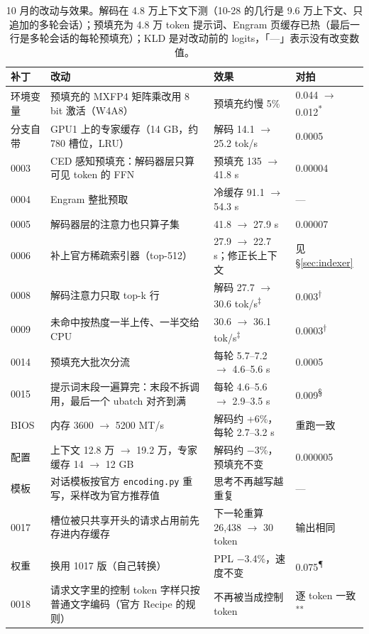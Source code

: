 \documentclass[11pt,a4paper]{article}
\newcommand{\code}[1]{\texttt{#1}}
\newcommand{\tps}{tok/s}
\begin{document}
\begin{table}[!tp]
  \centering
  \small
  \caption{10 月的改动与效果。解码在 4.8 万上下文下测（10-28 的几行是 9.6 万上下文、只追加的多轮会话）；预填充为 4.8 万 token 提示词、Engram 页缓存已热（最后一行是多轮会话的每轮预填充）；KLD 是对改动前的 logits，「—」表示没有改变数值。}
  \label{tab:summary}
  \begin{tabularx}{\textwidth}{@{}l X l l@{}}
    \toprule
    补丁 & 改动 & 效果 & 对拍 \\
    \midrule
    环境变量 & 预填充的 MXFP4 矩阵乘改用 8 bit 激活（W4A8） & 预填充约慢 5\% & 0.044 $\to$ 0.012\textsuperscript{*} \\
    分支自带 & GPU1 上的专家缓存（14 GB，约 780 槽位，LRU） & 解码 14.1 $\to$ 25.2 \tps{} & 0.0005 \\
    0003 & CED 感知预填充：解码器层只算可见 token 的 FFN & 预填充 135 $\to$ 41.8 s & 0.00004 \\
    0004 & Engram 整批预取 & 冷缓存 91.1 $\to$ 54.3 s & — \\
    0005 & 解码器层的注意力也只算子集 & 41.8 $\to$ 27.9 s & 0.00007 \\
    0006 & 补上官方稀疏索引器（top-512） & 27.9 $\to$ 22.7 s；修正长上下文 & 见 \S\ref{sec:indexer} \\
    0008 & 解码注意力只取 top-k 行 & 解码 27.7 $\to$ 30.6 \tps{}\textsuperscript{‡} & 0.003\textsuperscript{†} \\
    0009 & 未命中按热度一半上传、一半交给 CPU & 30.6 $\to$ 36.1 \tps{}\textsuperscript{‡} & 0.0003\textsuperscript{†} \\
    0014 & 预填充大批次分流 & 每轮 5.7--7.2 $\to$ 4.6--5.6 s & 0.0005 \\
    0015 & 提示词末段一遍算完：末段不拆调用，最后一个 ubatch 对齐到满 & 每轮 4.6--5.6 $\to$ 2.9--3.5 s & 0.009\textsuperscript{§} \\
    BIOS & 内存 3600 $\to$ 5200 MT/s & 解码约 +6\%，每轮 2.7--3.2 s & 重跑一致 \\
    配置 & 上下文 12.8 万 $\to$ 19.2 万，专家缓存 14 $\to$ 12 GB & 解码约 $-$3\%，预填充不变 & 0.000005 \\
    模板 & 对话模板按官方 \code{encoding.py} 重写，采样改为官方推荐值 & 思考不再越写越重复 & — \\
    0017 & 槽位被只共享开头的请求占用前先存进内存缓存 & 下一轮重算 26,438 $\to$ 30 token & 输出相同 \\
    权重 & 换用 1017 版（自己转换） & PPL $-$3.4\%，速度不变 & 0.075\textsuperscript{¶} \\
    0018 & 请求文字里的控制 token 字样只按普通文字编码（官方 Recipe 的规则） & 不再被当成控制 token & 逐 token 一致\textsuperscript{**} \\

\end{tabularx}
\end{table}
\end{document}
